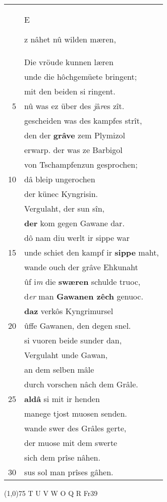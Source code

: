 \documentclass[8pt,a4paper,notitlepage]{article}
\begin{document}
\begin{table}[ht]
\begin{minipage}[t]{0.5\linewidth}
\begin{tabular}{rl}
 & \begin{Large}E\end{Large}z nâhet nû wilden mæren,\\ 
 & Die vröude kunnen læren\\ 
 & unde die hôchgemüete bringent;\\ 
 & mit den beiden si ringent.\\ 
5 & nû was ez über des \textit{j}â\textit{r}es zît.\\ 
 & gescheiden was des kampfes strît,\\ 
 & den der \textbf{grâve} zem Plymizol\\ 
 & erwarp. der was ze Barbigol\\ 
 & von Tschampfenzun gesprochen;\\ 
10 & dâ bleip ungerochen\\ 
 & der künec Kyngrisin.\\ 
 & Vergulaht, der sun sîn,\\ 
 & \textbf{der} kom gegen Gawane dar.\\ 
 & dô nam diu werlt ir sippe war\\ 
15 & unde schiet den kampf ir \textbf{sippe} maht,\\ 
 & wande ouch der grâve Ehkunaht\\ 
 & ûf i\textit{m} die \textbf{swæren} schulde truoc,\\ 
 & d\textit{er} man \textbf{Gawanen zêch} genuoc.\\ 
 & \textbf{daz} verkôs Kyngrimursel\\ 
20 & ûffe Gawanen, den degen snel.\\ 
 & si vuoren beide sunder dan,\\ 
 & Vergulaht unde Gawan,\\ 
 & an dem selben mâle\\ 
 & durch vorschen nâch dem Grâle.\\ 
25 & \textbf{aldâ} si mit ir henden\\ 
 & manege tjost muosen senden.\\ 
 & wande swer des Grâles gerte,\\ 
 & der muose mit dem swerte\\ 
 & sich dem prîse nâhen.\\ 
30 & sus sol man prîses gâhen.\\ 
\end{tabular}
\scriptsize
\line(1,0){75} \newline
T U V W O Q R Fr39 \newline

\end{minipage}
\end{table}
\end{document}
